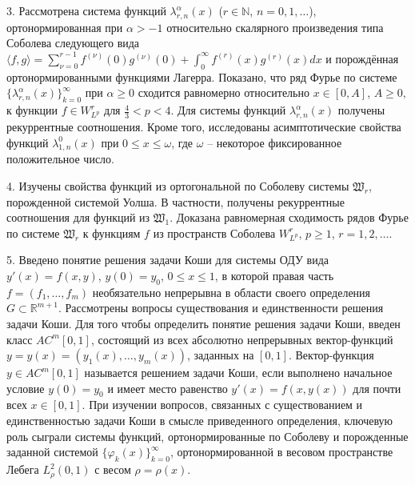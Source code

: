 3. Рассмотрена система функций $\lambda_{r,n}^{\alpha}(x)$ ($r\in\mathbb{N}$, $n=0, 1, \ldots$), ортонормированная при $\alpha>-1$ относительно скалярного произведения типа Соболева следующего вида $\langle f,g\rangle=\sum_{\nu=0}^{r-1}f^{(\nu)}(0)g^{(\nu)}(0)+\int_{0}^{\infty} f^{(r)}(x)g^{(r)}(x) dx$ и порождённая ортонормированными функциями Лагерра.
Показано, что ряд Фурье по системе $\{\lambda_{r,n}^{\alpha}(x)\}_{k=0}^\infty$ при $\alpha\geq0$ сходится равномерно относительно $x\in[0, A]$, $A\geq0,$ к функции $f\in W^r_{L^p}$ для $\frac{4}{3}<p<4$.
Для системы функций $\lambda_{r,n}^{\alpha}(x)$ получены рекуррентные соотношения.
Кроме того, исследованы асимптотические свойства функций $\lambda_{1,n}^0(x)$ при $0\leq x\leq\omega$, где $\omega$ -- некоторое фиксированное положительное число.

4. Изучены свойства функций из ортогональной по Соболеву системы $\mathfrak{W}_r$, порожденной системой Уолша.
В частности, получены рекуррентные соотношения для функций из $\mathfrak{W}_1$.
Доказана равномерная сходимость рядов Фурье по системе $\mathfrak{W}_r$ к функциям $f$ из пространств Соболева $W^r_{L^p}$, $p \ge 1$, $r=1,2,\ldots$.

5. Введено понятие решения задачи Коши для системы ОДУ вида
$ y'(x)=f(x,y)$, $y(0)=y_0$, $0\le x\le 1$, в которой правая часть  $f=(f_1,\ldots,f_m)$ необязательно непрерывна в области своего определения $G\subset\mathbb{R}^{m+1}$. Рассмотрены вопросы существования и единственности решения задачи Коши. Для того чтобы определить понятие  решения задачи Коши, введен класс  $AC^m[0,1]$, состоящий из всех абсолютно непрерывных вектор-функций $y=y(x)=(y_1(x),\ldots,y_m(x))$, заданных на $[0,1]$.
Вектор-функция $y\in AC^m[0,1]$ называется решением задачи Коши, если выполнено начальное условие $y(0)=y_0$ и имеет место равенство $y'(x)=f(x,y(x))$ для почти всех $x\in[0,1]$.
При изучении вопросов, связанных с существованием и единственностью задачи Коши в смысле приведенного определения, ключевую роль сыграли системы функций, ортонормированные по Соболеву и порожденные заданной системой  $\{\varphi_k(x)\}_{k=0}^\infty$, ортонормированной в весовом пространстве Лебега $L_\rho^2(0,1)$  с весом $\rho=\rho(x)$. 